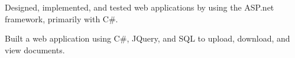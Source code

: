 \documentclass{jake-resume}
\begin{document}
\begin{minipage}[t]{0.66\textwidth}
\vspace{\topsep}
\begin{tightemize}
\item Designed, implemented, and tested web applications by using the ASP.net framework, primarily with C\#. \vspace{10pt}
\item Built a web application using C\#, JQuery, and SQL to upload, download, and view documents. \vspace{10pt}
\end{tightemize}
\end{minipage}%
\end{document}
